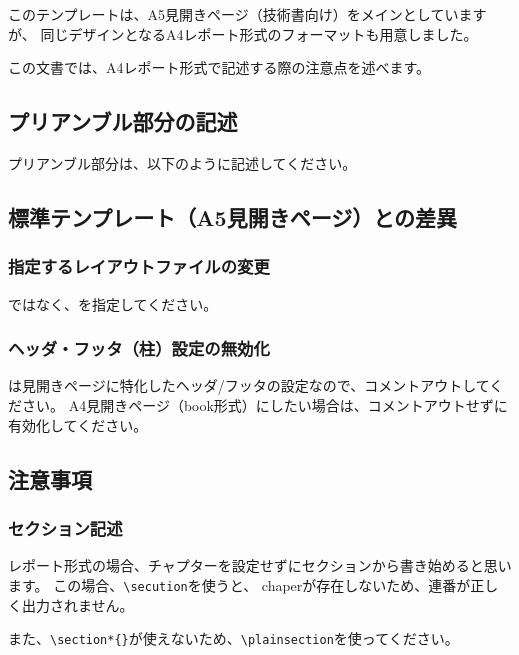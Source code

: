 \documentclass[10pt]{report}
\begin{document}
このテンプレートは、A5見開きページ（技術書向け）をメインとしていますが、
同じデザインとなるA4レポート形式のフォーマットも用意しました。

この文書では、A4レポート形式で記述する際の注意点を述べます。
\subsection{プリアンブル部分の記述}
プリアンブル部分は、以下のように記述してください。

\subsection{標準テンプレート（A5見開きページ）との差異}
\subsubsection{指定するレイアウトファイルの変更}
\verb||ではなく、\verb||を指定してください。

\subsubsection{ヘッダ・フッタ（柱）設定の無効化}
\verb||は見開きページに特化したヘッダ/フッタの設定なので、コメントアウトしてください。
A4見開きページ（book形式）にしたい場合は、コメントアウトせずに有効化してください。

\subsection{注意事項}
\subsubsection{セクション記述}
レポート形式の場合、チャプターを設定せずにセクションから書き始めると思います。
この場合、\verb|\secution|を使うと、
chaperが存在しないため、連番が正しく出力されません。

また、\verb|\section*{}|が使えないため、\verb|\plainsection|を使ってください。
\end{document}
